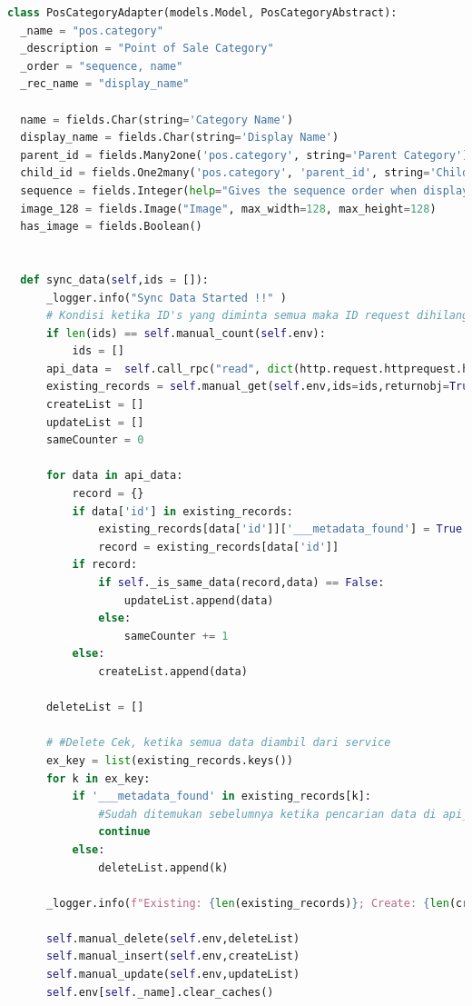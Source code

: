 \begin{lstlisting}[style=mystyle, language=Python, caption={Penerapan Class Adapter}]
class PosCategoryAdapter(models.Model, PosCategoryAbstract):
  _name = "pos.category"
  _description = "Point of Sale Category"
  _order = "sequence, name"
  _rec_name = "display_name"

  name = fields.Char(string='Category Name')
  display_name = fields.Char(string='Display Name')
  parent_id = fields.Many2one('pos.category', string='Parent Category')
  child_id = fields.One2many('pos.category', 'parent_id', string='Children Categories')
  sequence = fields.Integer(help="Gives the sequence order when displaying a list of product categories.")
  image_128 = fields.Image("Image", max_width=128, max_height=128)
  has_image = fields.Boolean()

   
  def sync_data(self,ids = []):
      _logger.info("Sync Data Started !!" )
      # Kondisi ketika ID's yang diminta semua maka ID request dihilangkan
      if len(ids) == self.manual_count(self.env):
          ids = []
      api_data =  self.call_rpc("read", dict(http.request.httprequest.headers), self.env.context ,[ids])
      existing_records = self.manual_get(self.env,ids=ids,returnobj=True)
      createList = []
      updateList = []
      sameCounter = 0
      
      for data in api_data:
          record = {}
          if data['id'] in existing_records:
              existing_records[data['id']]['___metadata_found'] = True
              record = existing_records[data['id']]
          if record:
              if self._is_same_data(record,data) == False:
                  updateList.append(data)
              else:
                  sameCounter += 1
          else:
              createList.append(data)
          
      deleteList = []
      
      # #Delete Cek, ketika semua data diambil dari service
      ex_key = list(existing_records.keys())
      for k in ex_key:
          if '___metadata_found' in existing_records[k]:
              #Sudah ditemukan sebelumnya ketika pencarian data di api_data
              continue
          else: 
              deleteList.append(k)
      
      _logger.info(f"Existing: {len(existing_records)}; Create: {len(createList)}; Update: {len(updateList)} , Delete: {len(deleteList)}, Unchange List: {sameCounter} ")
      
      self.manual_delete(self.env,deleteList)
      self.manual_insert(self.env,createList)
      self.manual_update(self.env,updateList)
      self.env[self._name].clear_caches()
  

\end{lstlisting}
